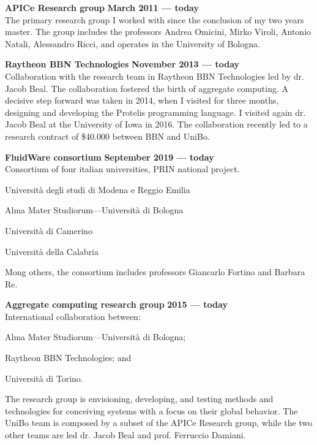 \textbf{APICe Research group} \hfill \textbf{March 2011 --- today}\\
The primary research group I worked with since the conclusion of my two years master. The group includes the professors Andrea Omicini, Mirko Viroli, Antonio Natali, Alessandro Ricci, and operates in the University of Bologna.

\halfblankline{}

\textbf{Raytheon BBN Technologies} \hfill \textbf{November 2013 --- today}\\
Collaboration with the research team in Raytheon BBN Technologies led by dr. Jacob Beal. The collaboration fostered the birth of aggregate computing. A decisive step forward was taken in 2014, when I visited for three months, designing and developing the Protelis programming language. I visited again dr. Jacob Beal at the University of Iowa in 2016. The collaboration recently led to a research contract of \$40.000 between BBN and UniBo.

\halfblankline{}

\textbf{FluidWare consortium} \hfill \textbf{September 2019 --- today}\\
Consortium of four italian universities, PRIN national project.
\begin{innerlist}
    \item Università degli studi di Modena e Reggio Emilia
    \item Alma Mater Studiorum---Università di Bologna
    \item Università di Camerino
    \item Università della Calabria
\end{innerlist}
Mong others, the consortium includes professors Giancarlo Fortino and Barbara Re.

\halfblankline{}

\textbf{Aggregate computing research group} \hfill \textbf{2015 --- today}\\
International collaboration between:
\begin{innerlist}
    \item Alma Mater Studiorum---Università di Bologna;
    \item Raytheon BBN Technologies; and
    \item Università di Torino.
\end{innerlist}
The research group is envisioning, developing, and testing methods and technologies for conceiving systems with a focus on their global behavior. The UniBo team is composed by a subset of the APICe Research group, while the two other teams are led dr. Jacob Beal and prof. Ferruccio Damiani.

